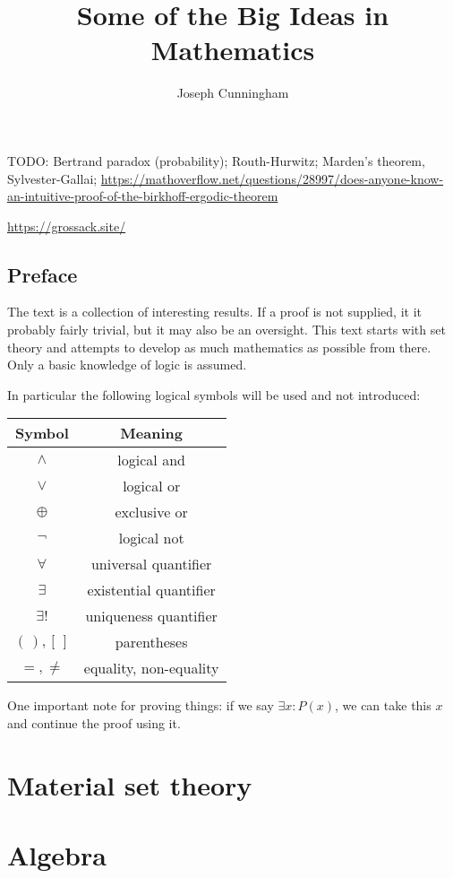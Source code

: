 \documentclass{report}
\title{Some of the Big Ideas in Mathematics}
\author{Joseph Cunningham}
\date{}
\begin{document}
\maketitle
\tableofcontents

TODO: Bertrand paradox (probability); Routh-Hurwitz; Marden's theorem, Sylvester-Gallai; \url{https://mathoverflow.net/questions/28997/does-anyone-know-an-intuitive-proof-of-the-birkhoff-ergodic-theorem}

\url{https://grossack.site/}

\chapter{Preface}
The text is a collection of interesting results. If a proof is not supplied, it it probably fairly trivial, but it may also be an oversight. This text starts with set theory and attempts to develop as much mathematics as possible from there. Only a basic knowledge of logic is assumed.

In particular the following logical symbols will be used and not introduced:
\begin{center}
\begin{tabular}{ c c }
Symbol & Meaning \\
 \hline
$\land$ & logical and \\
$\lor$ & logical or \\
$\oplus$ & exclusive or \\
$\neg$ & logical not \\
$\forall$ & universal quantifier \\
$\exists$ & existential quantifier \\
$\exists!$ & uniqueness quantifier \\
$(\,), [\,]$ & parentheses \\
$=, \neq$ & equality, non-equality
\end{tabular}
\end{center}

One important note for proving things: if we say $\exists x: P(x)$, we can take this $x$ and continue the proof using it.

\part{Material set theory}
\setcounter{chapter}{0} %



\part{Algebra}
\setcounter{chapter}{0} %

\end{document}
